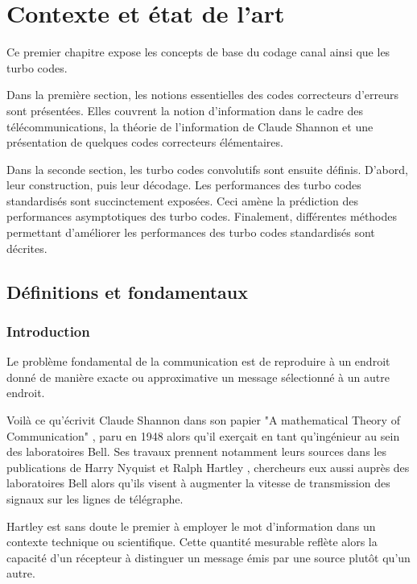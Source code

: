 
\chapter{Contexte et état de l'art}
Ce premier chapitre expose les concepts de base du codage canal ainsi que les turbo codes.

Dans la première section, les notions essentielles des codes correcteurs d'erreurs sont présentées. Elles couvrent la notion d'information dans le cadre des télécommunications, la théorie de l'information de Claude Shannon et une présentation de quelques codes correcteurs élémentaires.

Dans la seconde section, les turbo codes convolutifs sont ensuite définis. D'abord, leur construction, puis leur décodage. Les performances des turbo codes standardisés sont succinctement exposées. Ceci amène la prédiction des performances asymptotiques des turbo codes. Finalement, différentes méthodes permettant d'améliorer les performances des turbo codes standardisés sont décrites. 

\vspace*{\fill}
\minitocTITI
\vspace*{\fill}

\section{Définitions et fondamentaux}

\subsection{Introduction}
\og Le problème fondamental de la communication est de reproduire à un endroit donné de manière exacte ou approximative 
un message sélectionné à un autre endroit.\fg

Voilà ce qu'écrivit Claude Shannon dans son papier "A mathematical Theory of Communication" \cite{shannon_mathematical_2001}, 
paru en 1948 alors qu'il exerçait en tant qu'ingénieur au sein des laboratoires Bell. Ses travaux prennent notamment 
leurs sources dans les publications de Harry Nyquist \cite{nyquist_telegraph} et Ralph Hartley \cite{hartley_trans}, 
chercheurs eux aussi auprès des laboratoires Bell alors qu'ils visent à augmenter la vitesse de transmission des signaux sur 
les lignes de télégraphe. 

Hartley est sans doute le premier à employer le mot d'information dans un contexte technique ou scientifique. Cette 
quantité mesurable reflète alors la capacité d'un récepteur à distinguer un message émis par une 
source plutôt qu'un autre.

